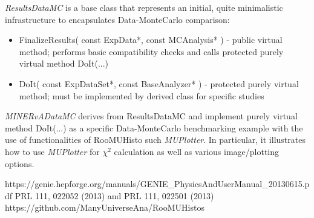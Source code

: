 {\it ResultsDataMC} is a base class that represents an initial, quite minimalistic infrastructure to encapsulates 
Data-MonteCarlo comparison:
\begin{itemize}
\item{  FinalizeResults( const ExpData*, const MCAnalysis* ) - public virtual method; performs basic compatibility 
checks and calls protected purely virtual method DoIt(...)}
\item{ DoIt( const ExpDataSet*, const BaseAnalyzer* ) - protected purely virtual method; must be implemented by derived
class for specific studies}
\end{itemize}

{\it MINERvADataMC} derives from ResultsDataMC and implement purely virtual method DoIt(...) as a specific Data-MonteCarlo
benchmarking example with the use of functionalities of RooMUHisto such {\it MUPlotter}. In particular, it illustrates how
to use {\it MUPlotter} for $\chi^{2}$ calculation as well as various image/plotting options. 


\begin{thebibliography}{99}
 https://genie.hepforge.org/manuals/GENIE\_PhysicsAndUserManual\_20130615.pdf
 PRL 111, 022052 (2013) and PRL 111, 022501 (2013)
 https://github.com/ManyUniverseAna/RooMUHistos
\end{thebibliography}


